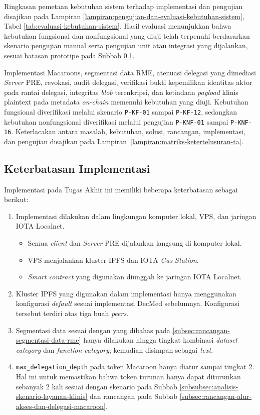 \documentclass[bahasa, 12pt, a4paper, onecolumn, oneside, final]{report}
\begin{document}
Ringkasan pemetaan kebutuhan sistem terhadap implementasi dan pengujian disajikan pada Lampiran \ref{lampiran:pengujian-dan-evaluasi-kebutuhan-sistem}, Tabel \ref{tab:evaluasi-kebutuhan-sistem}. Hasil evaluasi menunjukkan bahwa kebutuhan fungsional dan nonfungsional yang diuji telah terpenuhi berdasarkan skenario pengujian manual serta pengujian unit atau integrasi yang dijalankan, sesuai batasan prototipe pada Subbab \ref{subsec:keterbatasan-implementasi}.

Implementasi Macaroons, segmentasi data RME, atenuasi delegasi yang dimediasi \textit{Server} PRE, revokasi, audit delegasi, verifikasi bukti kepemilikan identitas aktor pada rantai delegasi, integritas \textit{blob} terenkripsi, dan ketiadaan \textit{payload} klinis plaintext pada metadata \textit{on-chain} memenuhi kebutuhan yang diuji. Kebutuhan fungsional diverifikasi melalui skenario \texttt{P-KF-01} sampai \texttt{P-KF-12}, sedangkan kebutuhan nonfungsional diverifikasi melalui pengujian \texttt{P-KNF-01} sampai \texttt{P-KNF-16}. Keterlacakan antara masalah, kebutuhan, solusi, rancangan, implementasi, dan pengujian disajikan pada Lampiran~\ref{lampiran:matriks-ketertelusuran-ta}.
\subsection{Keterbatasan Implementasi}
\label{subsec:keterbatasan-implementasi}

Implementasi pada Tugas Akhir ini memiliki beberapa keterbatasan sebagai berikut:

\begin{enumerate}
	\item Implementasi dilakukan dalam lingkungan komputer lokal, VPS, dan jaringan IOTA Localnet.
	      \begin{itemize}
		      \item Semua \textit{client} dan \textit{Server} PRE dijalankan langsung di komputer lokal.
		      \item VPS menjalankan kluster IPFS dan IOTA \textit{Gas Station}.
		      \item \textit{Smart contract} yang digunakan diunggah ke jaringan IOTA Localnet.
	      \end{itemize}
	\item Kluster IPFS yang digunakan dalam implementasi hanya menggunakan konfigurasi \textit{default} sesuai implementasi DecMed sebelumnya. Konfigurasi tersebut terdiri atas tiga buah \textit{peers}.
	\item Segmentasi data sesuai dengan yang dibahas pada \ref{subsec:rancangan-segmentasi-data-rme} hanya dilakukan hingga tingkat kombinasi \textit{dataset category} dan \textit{function category}, kemudian disimpan sebagai \textit{text}.
	\item \texttt{max\_delegation\_depth} pada token Macaroon hanya diatur sampai tingkat 2. Hal ini untuk memastikan bahwa token turunan hanya dapat diturunkan sebanyak 2 kali sesuai dengan skenario pada Subbab \ref{subsubsec:analisis-skenario-layanan-klinis} dan rancangan pada Subbab \ref{subsec:rancangan-alur-akses-dan-delegasi-macaroon}.
\end{enumerate}
\end{document}
